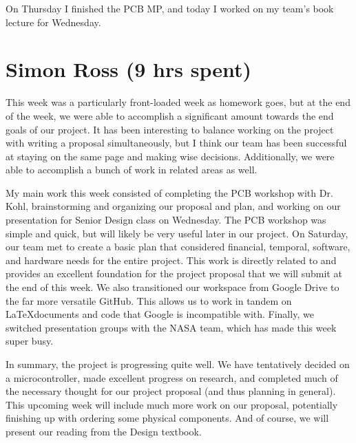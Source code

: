 \documentclass[12pt, titlepage]{article}
\begin{document}
On Thursday I finished the PCB MP, and today I worked on my team’s book lecture for Wednesday.

\section*{Simon Ross (9 hrs spent)}

This week was a particularly front-loaded week as homework goes, but at the end of the week, we were able to accomplish a significant amount towards the end goals of our project. It has been interesting to balance working on the project with writing a proposal simultaneously, but I think our team has been successful at staying on the same page and making wise decisions. Additionally, we were able to accomplish a bunch of work in related areas as well.

My main work this week consisted of completing the PCB workshop with Dr. Kohl, brainstorming and organizing our proposal and plan, and working on our presentation for Senior Design class on Wednesday. The PCB workshop was simple and quick, but will likely be very useful later in our project. On Saturday, our team met to create a basic plan that considered financial, temporal, software, and hardware needs for the entire project. This work is directly related to and provides an excellent foundation for the project proposal that we will submit at the end of this week. We also transitioned our workspace from Google Drive to the far more versatile GitHub. This allows us to work in tandem on \LaTeX documents and code that Google is incompatible with. Finally, we switched presentation groups with the NASA team, which has made this week super busy. 

In summary, the project is progressing quite well. We have tentatively decided on a microcontroller, made excellent progress on research, and completed much of the necessary thought for our project proposal (and thus planning in general). This upcoming week will include much more work on our proposal, potentially finishing up with ordering some physical components. And of course, we will present our reading from the Design textbook.
\end{document}
